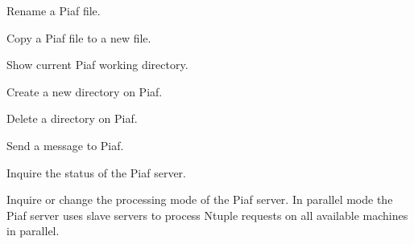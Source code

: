    \par
Rename a Piaf file.  

\ENDCMD


\BEGARG
{}
\ENDARG

   \par
Copy a Piaf file to a new file.  

\ENDCMD


   \par
Show current Piaf working directory.  

\ENDCMD


\BEGARG
{}
\ENDARG

   \par
Create a new directory on Piaf.  

\ENDCMD


\BEGARG
{}
\ENDARG

   \par
Delete a directory on Piaf.  

\ENDCMD


\BEGARG
{}
\ENDARG

   \par
Send a message to Piaf.  

\ENDCMD


   \par
Inquire the status of the Piaf server.  

\ENDCMD


\BEGARG
{}
\ENDARG
{}
\ENDOPT

   \par
Inquire or change the processing mode of the Piaf server.  In parallel mode 
   the Piaf server uses slave servers to process Ntuple requests on all 
   available machines in parallel.  

